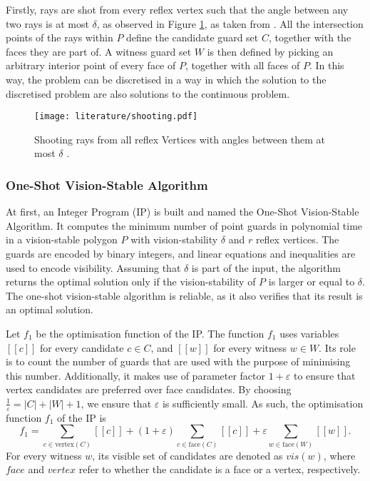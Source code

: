 Firstly, rays are shot from every reflex vertex such that the angle between any two rays is at most $\delta$, as observed in Figure \ref{fig:rays}, as taken from \cite{DBLP:journals/corr/abs-2007-06920}. All the intersection points of the rays within $P$ define the candidate guard set $C$, together with the faces they are part of. A witness guard set $W$ is then defined by picking an arbitrary interior point of every face of $P$, together with all faces of $P$. In this way, the problem can be discretised in a way in which the solution to the discretised problem are also solutions to the continuous problem.

\begin{figure}[h!]
    \centering
    \texttt{[image: literature/shooting.pdf]}
    \caption{Shooting rays from all reflex Vertices with angles between them at most $\delta$ \cite{DBLP:journals/corr/abs-2007-06920}.}
    \label{fig:rays}
\end{figure}

\newpage
\subsubsection{One-Shot Vision-Stable Algorithm}
At first, an Integer Program (IP) is built and named the One-Shot Vision-Stable Algorithm. It computes the minimum number of point guards in polynomial time in a vision-stable polygon $P$ with  vision-stability $\delta$ and $r$ reflex vertices. The guards are encoded by binary integers, and linear equations and inequalities are used to encode visibility. Assuming that $\delta$ is part of the input, the algorithm returns the optimal solution only if the vision-stability of $P$ is larger or equal to $\delta$. The one-shot vision-stable algorithm is reliable, as it also verifies that its result is an optimal solution. 

Let $f_1$ be the optimisation function of the IP. The function $f_1$ uses variables $[[c]]$ for every candidate $c \in C$, and $[[w]]$ for every witness $w \in W$. Its role is to count the number of guards that are used with the purpose of minimising this number. Additionally, it makes use of parameter factor $1 + \varepsilon$  to ensure that vertex candidates are preferred over face candidates. By choosing $\frac 1 \varepsilon = |C| + |W| + 1$, we ensure that $\varepsilon$ is sufficiently small. As such, the optimisation function $f_1$ of the IP is 
$$f_1 = \sum_{c \in \text{vertex}(C)} [[c]] + (1 + \varepsilon)\sum_{c \in \text{face}(C)} [[c]] + \varepsilon \sum_{w \in \text{face}(W)} [[w]].$$
For every witness $w$, its visible set of candidates are denoted as $vis(w)$, where $face$ and $vertex$ refer to whether the candidate is a face or a vertex, respectively.

